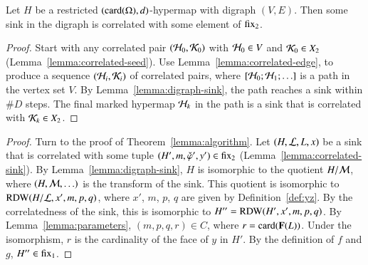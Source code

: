 \begin{lemma}\label{lemma:correlated-sink}
Let $H$ be a restricted $({\operatorname{card}}(\Omega),d)$-hypermap with digraph $(V,E)$.
Then some sink in the digraph is correlated with some element of
${\operatorname{fix}}_2$.
\end{lemma}

\begin{proof} Start with any  correlated pair $({\cal
    H}_0,{\cal K}_0)$ with ${\cal H}_0\in V$ and ${\cal K}_0\in X_2$ 
  (Lemma~\ref{lemma:correlated-seed}).  Use
  Lemma~\ref{lemma:correlated-edge}, to produce a sequence $({\cal
    H}_i,{\cal K}_i)$ of correlated pairs, where $[{\cal H}_0;{\cal
    H}_1;\ldots]$ is a path in the vertex set $V$.  By Lemma~\ref{lemma:digraph-sink},
  the path reaches a sink within $\#D$ steps.  The final marked
  hypermap ${\cal H}_k$ in the path is a sink that is correlated with
  ${\cal K}_k\in X_2$.
\end{proof}

\begin{proof} Turn to the proof of Theorem~\ref{lemma:algorithm}.  Let
  $(H,{\cal L},L,x)$ be a sink that is correlated with some tuple
  $(H',m,\check\varphi',y')\in {\operatorname{fix}}_2$
  (Lemma~\ref{lemma:correlated-sink}).  By
  Lemma~\ref{lemma:digraph-sink}, $H$ is isomorphic to the quotient
  $H/{\cal M}$, where $(H,{\cal M},\ldots)$ is the transform of the
  sink.  This quotient is isomorphic to ${\operatorname{RDW}}(H/{\cal
    L},x',m,p,q)$, where $x'$, $m$, $p$, $q$ are given by
  Definition~\ref{def:yz}.  By the correlatedness of the sink, this is
  isomorphic to $H''={\operatorname{RDW}}(H',x',m,p,q)$.  By
  Lemma~\ref{lemma:parameters}, $(m,p,q,r)\in C$, where
  $r={\operatorname{card}}({\mathbf F}(L))$.  Under the isomorphism, $r$ is the cardinality
  of the face of $y$ in $H'$.  By the definition of $f$ and $g$,
  $H''\in {\operatorname{fix}}_1$.
\end{proof}





